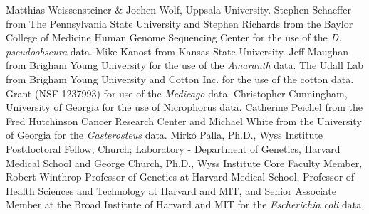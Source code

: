 \documentclass{bmcart}
\begin{document}
\begin{backmatter}
Matthias Weissensteiner \& Jochen Wolf, Uppsala University. Stephen Schaeffer from The Pennsylvania State University and Stephen Richards from the Baylor College of Medicine Human Genome Sequencing Center for the use of the \textit{D. pseudoobscura} data. Mike Kanost from Kansas State University. Jeff Maughan from Brigham Young University for the use of the \textit{Amaranth} data. The Udall Lab from Brigham Young University and Cotton Inc. for the use of the cotton data. Grant (NSF 1237993) for use of the \textit{Medicago} data. Christopher Cunningham, University of Georgia for the use of Nicrophorus data. Catherine Peichel from the Fred Hutchinson Cancer Research Center and Michael White from the University of Georgia for the \textit{Gasterosteus} data. Mirk{\'{o}} Palla, Ph.D., Wyss Institute Postdoctoral Fellow, Church; Laboratory - Department of Genetics, Harvard Medical School and George Church, Ph.D., Wyss Institute Core Faculty Member, Robert Winthrop Professor of Genetics at Harvard Medical School, Professor of Health Sciences and Technology at Harvard and MIT, and Senior Associate Member at the Broad Institute of Harvard and MIT for the \textit{Escherichia coli} data.







\end{backmatter}
\end{document}
